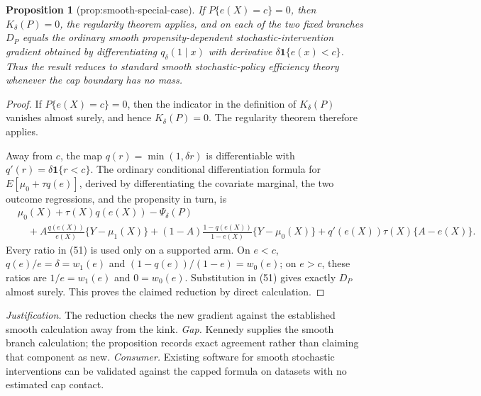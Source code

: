 \documentclass{article}
\newtheorem{proposition}{Proposition}
\begin{document}
\begin{proposition}[prop:smooth-special-case]\label{prop:smooth-special-case}
If \(P\{e(X)=c\}=0\), then \(K_\delta(P)=0\), the regularity theorem applies, and on each of the two fixed branches \(D_P\) equals the ordinary smooth propensity-dependent stochastic-intervention gradient obtained by differentiating \(q_\delta(1\mid x)\) with derivative \(\delta\mathbf 1\{e(x)<c\}\). Thus the result reduces to standard smooth stochastic-policy efficiency theory whenever the cap boundary has no mass.
\end{proposition}
\begin{proof}
If \(P\{e(X)=c\}=0\), then the indicator in the definition of \(K_\delta(P)\) vanishes almost surely, and hence \(K_\delta(P)=0\).  The regularity theorem therefore applies.

Away from \(c\), the map \(q(r)=\min(1,\delta r)\) is differentiable with
\(q'(r)=\delta\mathbf1\{r<c\}\).  The ordinary conditional differentiation formula for
\(E[\mu_0+\tau q(e)]\), derived by differentiating the covariate marginal, the two outcome regressions, and the propensity in turn, is
\begin{equation}
\begin{aligned}
 &\mu_0(X)+\tau(X)q(e(X))-\Psi_\delta(P)\\
 &\quad+A\frac{q(e(X))}{e(X)}\{Y-\mu_1(X)\}
 +(1-A)\frac{1-q(e(X))}{1-e(X)}\{Y-\mu_0(X)\}
 +q'(e(X))\tau(X)\{A-e(X)\}.
\end{aligned}                                                                             \tag{51}
\end{equation}
Every ratio in (51) is used only on a supported arm.  On \(e<c\),
\(q(e)/e=\delta=w_1(e)\) and
\((1-q(e))/(1-e)=w_0(e)\); on \(e>c\), these ratios are
\(1/e=w_1(e)\) and \(0=w_0(e)\).  Substitution in (51) gives exactly \(D_P\) almost surely.  This proves the claimed reduction by direct calculation.
\end{proof}
\par\smallskip\noindent \textit{Justification.} The reduction checks the new gradient against the established smooth calculation away from the kink. \textit{Gap.} Kennedy supplies the smooth branch calculation; the proposition records exact agreement rather than claiming that component as new. \textit{Consumer.} Existing software for smooth stochastic interventions can be validated against the capped formula on datasets with no estimated cap contact.
\end{document}
